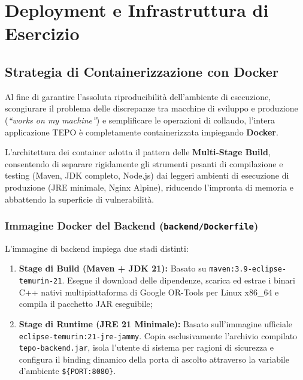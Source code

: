 \section{Deployment e Infrastruttura di Esercizio}
\label{sec:deployment_esercizio}

\subsection{Strategia di Containerizzazione con Docker}
Al fine di garantire l'assoluta riproducibilità dell'ambiente di esecuzione, scongiurare il problema delle discrepanze tra macchine di sviluppo e produzione (\emph{``works on my machine''}) e semplificare le operazioni di collaudo, l'intera applicazione TEPO è completamente containerizzata impiegando \textbf{Docker}.

L'architettura dei container adotta il pattern delle \textbf{Multi-Stage Build}, consentendo di separare rigidamente gli strumenti pesanti di compilazione e testing (Maven, JDK completo, Node.js) dai leggeri ambienti di esecuzione di produzione (JRE minimale, Nginx Alpine), riducendo l'impronta di memoria e abbattendo la superficie di vulnerabilità.

\subsubsection{Immagine Docker del Backend (\texttt{backend/Dockerfile})}
L'immagine di backend impiega due stadi distinti:
\begin{enumerate}[leftmargin=1.5em, itemsep=0.2em]
    \item \textbf{Stage di Build (Maven + JDK 21):} Basato su \texttt{maven:3.9-eclipse-temurin-21}. Esegue il download delle dipendenze, scarica ed estrae i binari C++ nativi multipiattaforma di Google OR-Tools per Linux x86\_64 e compila il pacchetto JAR eseguibile;
    \item \textbf{Stage di Runtime (JRE 21 Minimale):} Basato sull'immagine ufficiale \texttt{eclipse-temurin:21-jre-jammy}. Copia esclusivamente l'archivio compilato \texttt{tepo-backend.jar}, isola l'utente di sistema per ragioni di sicurezza e configura il binding dinamico della porta di ascolto attraverso la variabile d'ambiente \texttt{\$\{PORT:8080\}}.
\end{enumerate}

